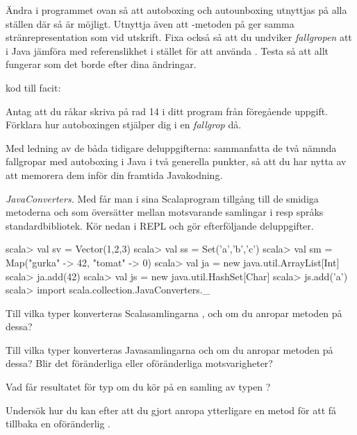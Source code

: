 
\Subtask Ändra i programmet ovan så att autoboxing och autounboxing utnyttjas på alla ställen där så är möjligt. Utnyttja även att -metoden på  ger samma stränrepresentation som  vid utskrift. Fixa också så att du undviker \emph{fallgropen} att i Java jämföra med referenslikhet i stället för att använda . Testa så att allt fungerar som det borde efter dina ändringar.

\TODO kod till facit:

\Subtask\Pen Antag att du råkar skriva  på rad 14 i ditt program från föregående uppgift. Förklara hur autoboxingen stjälper dig i en \emph{fallgrop} då. 

\Subtask\Pen Med ledning av de båda tidigare deluppgifterna: sammanfatta de två nämnda fallgropar med autoboxing i Java i två generella punkter, så att du har nytta av att memorera dem inför din framtida Javakodning.


\Task \emph{JavaConverters.} Med  får man i sina Scalaprogram tillgång till de smidiga metoderna  och  som översätter mellan motsvarande samlingar i resp språks standardbibliotek. Kör nedan i REPL och gör efterföljande deluppgifter.

\begin{REPL}
scala> val sv = Vector(1,2,3)
scala> val ss = Set('a','b','c')
scala> val sm = Map("gurka" -> 42, "tomat" -> 0) 
scala> val ja = new java.util.ArrayList[Int]
scala> ja.add(42)
scala> val js = new java.util.HashSet[Char]
scala> js.add('a')
scala> import scala.collection.JavaConverters._
\end{REPL}

\Subtask Till vilka typer konverteras Scalasamlingarna ,  och  om du anropar metoden  på dessa?

\Subtask Till vilka typer konverteras Javasamlingarna  och   om du anropar metoden  på dessa? Blir det föränderliga eller oföränderliga motsvarigheter?

\Subtask Vad får resultatet för typ om du kör  på en samling av typen ? 

\Subtask Undersök hur du kan efter att du gjort  anropa ytterligare en metod för att få tillbaka en oföränderlig .

